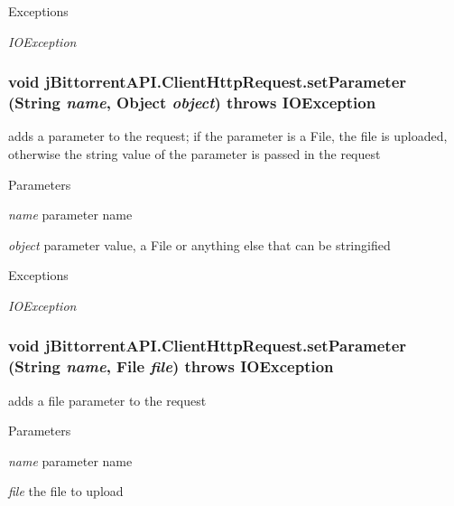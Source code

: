 \begin{DoxyExceptions}{Exceptions}
\item[{\em IOException}]\end{DoxyExceptions}
\hypertarget{classj_bittorrent_a_p_i_1_1_client_http_request_a90699712291d1398c7affe4d9269a457}{
\subsubsection[{setParameter}]{\setlength{\rightskip}{0pt plus 5cm}void jBittorrentAPI.ClientHttpRequest.setParameter (String {\em name}, \/  Object {\em object})  throws IOException }}
\label{classj_bittorrent_a_p_i_1_1_client_http_request_a90699712291d1398c7affe4d9269a457}
adds a parameter to the request; if the parameter is a File, the file is uploaded, otherwise the string value of the parameter is passed in the request 
\begin{DoxyParams}{Parameters}
\item[{\em name}]parameter name \item[{\em object}]parameter value, a File or anything else that can be stringified \end{DoxyParams}

\begin{DoxyExceptions}{Exceptions}
\item[{\em IOException}]\end{DoxyExceptions}
\hypertarget{classj_bittorrent_a_p_i_1_1_client_http_request_a1e193309e45fe3362f454948aec0233e}{
\subsubsection[{setParameter}]{\setlength{\rightskip}{0pt plus 5cm}void jBittorrentAPI.ClientHttpRequest.setParameter (String {\em name}, \/  File {\em file})  throws IOException }}
\label{classj_bittorrent_a_p_i_1_1_client_http_request_a1e193309e45fe3362f454948aec0233e}
adds a file parameter to the request 
\begin{DoxyParams}{Parameters}
\item[{\em name}]parameter name \item[{\em file}]the file to upload \end{DoxyParams}

